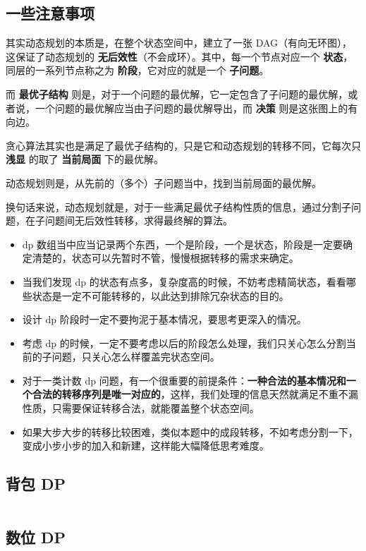 \documentclass[titlepage, a4paper]{article}
\begin{document}
\begin{multicols}{2}
\begin{spacing}{0.6}
			 	\subsection{一些注意事项}
			 		其实动态规划的本质是，在整个状态空间中，建立了一张 DAG（有向无环图），这保证了动态规划的 \textbf{无后效性}（不会成环）。其中，每一个节点对应一个 \textbf{状态}，同层的一系列节点称之为 \textbf{阶段}，它对应的就是一个 \textbf{子问题}。
			 		
			 		而 \textbf{最优子结构} 则是，对于一个问题的最优解，它一定包含了子问题的最优解，或者说，一个问题的最优解应当由子问题的最优解导出，而 \textbf{决策} 则是这张图上的有向边。
			 		
			 		贪心算法其实也是满足了最优子结构的，只是它和动态规划的转移不同，它每次只 \textbf{浅显} 的取了 \textbf{当前局面} 下的最优解。
			 		
			 		动态规划则是，从先前的（多个）子问题当中，找到当前局面的最优解。
			 		
			 		换句话来说，动态规划就是，对于一些满足最优子结构性质的信息，通过分割子问题，在子问题间无后效性转移，求得最终解的算法。
			 		
			 		\begin{itemize}
			 			\item dp 数组当中应当记录两个东西，一个是阶段，一个是状态，阶段是一定要确定清楚的，状态可以先暂时不管，慢慢根据转移的需求来确定。
			 			\item 当我们发现 dp 的状态有点多，复杂度高的时候，不妨考虑精简状态，看看哪些状态是一定不可能转移的，以此达到排除冗杂状态的目的。
			 			\item 设计 dp 阶段时一定不要拘泥于基本情况，要思考更深入的情况。
			 			\item 考虑 dp 的时候，一定不要考虑以后的阶段怎么处理，我们只关心怎么分割当前的子问题，只关心怎么样覆盖完状态空间。
			 			\item 对于一类计数 dp 问题，有一个很重要的前提条件：\textbf{一种合法的基本情况和一个合法的转移序列是唯一对应的}，这样，我们处理的信息天然就满足不重不漏性质，只需要保证转移合法，就能覆盖整个状态空间。
			 			\item 如果大步大步的转移比较困难，类似本题中的成段转移，不如考虑分割一下，变成小步小步的加入和新建，这样能大幅降低思考难度。
			 		\end{itemize}
		 		\subsection{背包 DP}
		 			\inputminted{cpp}{src/Dp/Pack.cpp}
			 	\subsection{数位 DP}
			 		\inputminted{python}{src/Dp/Dight_dp.py}

\end{spacing}
\end{multicols}
\end{document}
